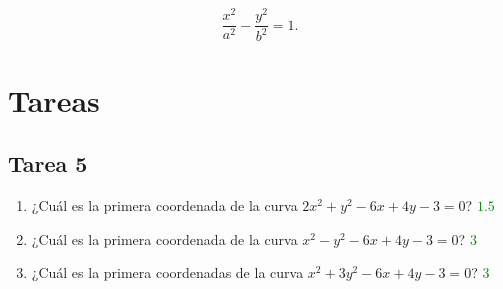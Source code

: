 \documentclass{article}
\theoremstyle{definicion}
\theoremstyle{definition}             %
\theoremstyle{definition}             %
\theoremstyle{definition}
\theoremstyle{definition}
\theoremstyle{observacion}
\theoremstyle{definition}
\theoremstyle{plain}
\theoremstyle{definition}
\theoremstyle{afirmacion}
\theoremstyle{notation}
\theoremstyle{definition}
\begin{document}
    \begin{equation*}
        \dfrac{x^{2}}{a^{2}} - \dfrac{y^{2}}{b^{2}} = 1.
    \end{equation*}

    \section{Tareas}

    \subsection{Tarea 5}

    \begin{enumerate}[label = Preg. \arabic*.]
        \item ¿Cuál es la primera coordenada de la curva \(2x^{2} + y^{2} - 6x + 4y - 3 = 0\)? \textcolor{green}{\(1.5\)}
        \item ¿Cuál es la primera coordenada de la curva \(x^{2} - y^{2} - 6x + 4y - 3 = 0\)? \textcolor{green}{\(3\)}
        \item ¿Cuál es la primera coordenadas de la curva \(x^{2} + 3y^{2} - 6x + 4y - 3 = 0\)? \textcolor{green}{\(3\)}
    \end{enumerate}
\end{document}
